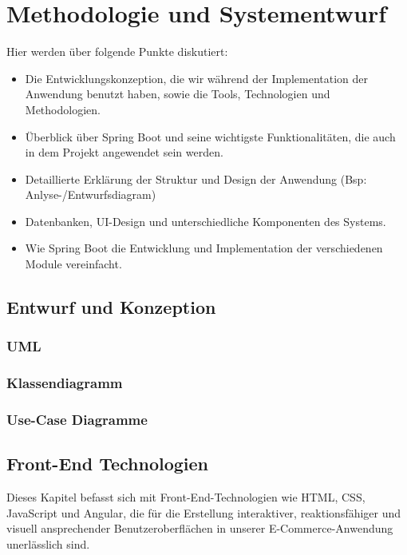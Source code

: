 \chapter{Methodologie und Systementwurf }

Hier werden über folgende Punkte diskutiert:

\begin{itemize}
	\item Die Entwicklungskonzeption, die wir während der Implementation der Anwendung benutzt haben, sowie die Tools, Technologien und Methodologien. 
	\item Überblick über Spring Boot und seine wichtigste  Funktionalitäten, die auch in dem Projekt angewendet sein werden. 
	\item Detaillierte Erklärung der Struktur und Design der Anwendung (Bsp: Anlyse-/Entwurfsdiagram) 
	\item Datenbanken, UI-Design und unterschiedliche Komponenten des Systems. 
	\item Wie Spring Boot die Entwicklung und Implementation der verschiedenen Module vereinfacht. 
\end{itemize}


\section{Entwurf und Konzeption}

\subsection{UML}

\subsection{Klassendiagramm}

\subsection{Use-Case Diagramme}


\section{Front-End Technologien}

Dieses Kapitel befasst sich mit Front-End-Technologien wie HTML, CSS, JavaScript und Angular, die für die Erstellung interaktiver, reaktionsfähiger und visuell ansprechender Benutzeroberflächen in unserer E-Commerce-Anwendung unerlässlich sind.

